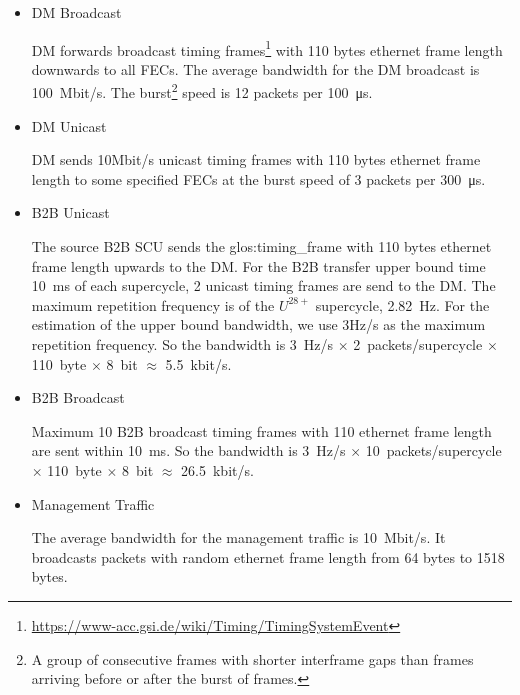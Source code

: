 \begin{itemize}
    \item DM Broadcast 

DM forwards broadcast timing frames\footnote{\url{https://www-acc.gsi.de/wiki/Timing/TimingSystemEvent}} with 110 bytes ethernet frame length downwards to all FECs. The average bandwidth for the DM broadcast is \SI{100}{Mbit/s}. The burst\footnote{A group of consecutive frames with shorter interframe gaps than frames arriving before or after the burst of frames.} speed is 12 packets per \SI{100}{\micro\second}.
 		\item DM Unicast 

DM sends 10Mbit/s unicast timing frames with 110 bytes ethernet frame length to some specified FECs at the burst speed of 3 packets per \SI{300}{\micro\second}.
	\item B2B Unicast

The source B2B SCU sends the \gls{glos:timing_frame} with 110 bytes ethernet frame length upwards to the DM. For the B2B transfer upper bound time \SI{10}{\ms} of each supercycle, 2 unicast timing frames are send to the DM. The maximum repetition frequency is of the $U^{28+}$ supercycle, \SI{2.82}{\Hz}. For the estimation of the upper bound bandwidth, we use 3Hz/s as the maximum repetition frequency.  So the bandwidth is \SI{3}{\Hz/\second} $\times$ \SI{2}{packets/supercycle} $\times$ \SI{110}{byte} $\times$ \SI{8}{bit} $\approx$ \SI{5.5}{kbit/s}. 
	\item B2B Broadcast

Maximum 10 B2B broadcast timing frames with 110 ethernet frame length are sent within \SI{10}{\ms}. So the bandwidth is \SI{3}{\Hz/\second} $\times$ \SI{10}{packets/supercycle} $\times$ \SI{110}{byte} $\times$ \SI{8}{bit} $\approx$ \SI{26.5}{kbit/s}.

	\item Management Traffic

The average bandwidth for the management traffic is \SI{10}{Mbit/s}. It broadcasts packets with random ethernet frame length from 64 bytes to 1518 bytes. 
\end{itemize}

